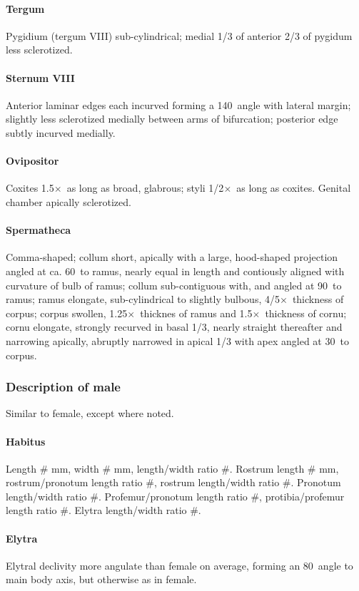 \documentclass[fleqn,10pt,lineno]{wlpeerj} %
\newcommand{\td}{\textdegree~}
\newcommand{\x}{$\times$~}
\begin{document}
			\paragraph{Tergum}
				Pygidium (tergum VIII) sub-cylindrical; medial 1/3 of anterior 2/3 of pygidum less sclerotized.
			\paragraph{Sternum VIII}
				Anterior laminar edges each incurved forming a 140\td angle with lateral margin; slightly less sclerotized medially between arms of bifurcation; posterior edge subtly incurved medially.
			\paragraph{Ovipositor}
				Coxites 1.5\x as long as broad, glabrous; styli 1/2\x as long as coxites. Genital chamber apically sclerotized.
			\paragraph{Spermatheca}
				Comma-shaped; collum short, apically with a large, hood-shaped projection angled at ca. 60\td to ramus, nearly equal in length and contiously aligned with curvature of bulb of ramus; collum sub-contiguous with, and angled at 90\td to ramus; ramus elongate, sub-cylindrical to slightly bulbous, 4/5\x thickness of corpus; corpus swollen, 1.25\x thicknes of ramus and 1.5\x thickness of cornu; cornu elongate, strongly recurved in basal 1/3, nearly straight thereafter and narrowing apically, abruptly narrowed in apical 1/3 with apex angled at 30\td to corpus.
		\subsubsection*{Description of male}
			Similar to female, except where noted.
			\paragraph{Habitus}
				Length \# mm, width \# mm, length/width ratio \#. Rostrum length \# mm, rostrum/pronotum length ratio \#, rostrum length/width ratio \#. Pronotum length/width ratio \#. Profemur/pronotum length ratio \#, protibia/profemur length ratio \#. Elytra length/width ratio \#.
			\paragraph{Elytra}
				Elytral declivity more angulate than female on average, forming an 80\td angle to main body axis, but otherwise as in female.
\end{document}
